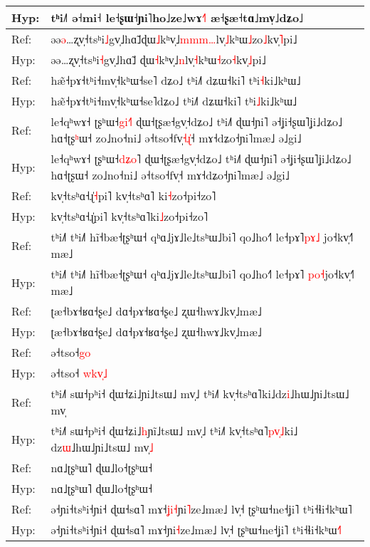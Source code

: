 \documentclass[10pt]{article}
\DeclareRobustCommand{\hl}[1]{{\textcolor{red}{#1}}}
\begin{document}
\begin{longtable}{ll}
Hyp: & tʰi˩˥ ə˧mi˧\hl{ }le˧ʂɯ˧ɲi˥ho˩ze˩wɤ\hl{˧}\hl{˥} æ˧ʂæ˧tɑ˩mv̩˩dʑo˩ \\ 
\midrule 
Ref: & əə\hl{ə}…ʐv̩˧tsʰi\hl{˩}gv̩˩hɑ̃˩ɖɯ\hl{˩}kʰv̩˩\hl{m}\hl{m}\hl{m}\hl{…}lv̩\hl{˩}kʰɯ\hl{˩}zo\hl{˩}kv̩\hl{˥}pi˩ \\ 
Hyp: & əə…ʐv̩˧tsʰi\hl{˧}gv̩˩hɑ̃˩\hl{ }ɖɯ\hl{˧}kʰv̩˩\hl{n}lv̩\hl{˧}kʰɯ\hl{˧}zo\hl{˧}kv̩\hl{˩}pi˩ \\ 
\midrule 
Ref: & hæ̃˧pɤ˧tʰi˧mv̩˧kʰɯ˧se˥\hl{ }dʑo˩ tʰi˩˥ dʑɯ˧ki˥ tʰi\hl{˧}ki˩kʰɯ˩ \\ 
Hyp: & hæ̃˧pɤ˧tʰi˧mv̩˧kʰɯ˧se˥dʑo˩ tʰi˩˥ dʑɯ˧ki˥ tʰi\hl{˩}ki˩kʰɯ˩ \\ 
\midrule 
Ref: & le˧qʰwɤ˧ ʈʂʰɯ˧\hl{g}\hl{i}\hl{˧}˥ ɖɯ˧ʈʂæ˧gv̩˧dʑo˩ tʰi˩˥ ɖɯ˧ɲi˥ ə˧ʝi˧ʂɯ˥ʝi˩dʑo˩ hɑ˧ʈʂ\hl{ʰ}ɯ˧ zo˩no˧ni˩ ə˧tso˧fv̩\hl{˧}\hl{ɻ}\hl{̍}˧ mɤ˧dʑo˧ɲi˥mæ˩ ə˩gi˩ \\ 
Hyp: & le˧qʰwɤ˧ ʈʂʰɯ˧\hl{d}\hl{ʑ}\hl{o}˥ ɖɯ˧ʈʂæ˧gv̩˧dʑo˩ tʰi˩˥ ɖɯ˧ɲi˥ ə˧ʝi˧ʂɯ˥ʝi˩dʑo˩ hɑ˧ʈʂɯ˧ zo˩no˧ni˩ ə˧tso˧fv̩˧ mɤ˧dʑo˧ɲi˥mæ˩ ə˩gi˩ \\ 
\midrule 
Ref: & kv̩˧tsʰɑ˧ɻ̍\hl{˧}pi˥ kv̩˧tsʰɑ˥\hl{ }ki\hl{˧}zo˧pi˧zo˥ \\ 
Hyp: & kv̩˧tsʰɑ˧ɻ̍pi˥ kv̩˧tsʰɑ˥ki\hl{˩}zo˧pi˧zo˥ \\ 
\midrule 
Ref: & tʰi˩˥ tʰi˩˥ hĩ˧bæ˧ʈʂʰɯ˧ qʰɑ˩jɤ˩le˩tsʰɯ˩bi˥ qo˩ho˧˥ le˧pɤ˥\hl{p}\hl{ɤ}\hl{˩}\hl{ }jo˧kv̩˧˥ mæ˩ \\ 
Hyp: & tʰi˩˥ tʰi˩˥ hĩ˧bæ˧ʈʂʰɯ˧ qʰɑ˩jɤ˩le˩tsʰɯ˩bi˥ qo˩ho˧˥ le˧pɤ˥\hl{ }\hl{p}\hl{o}\hl{˧}jo˧kv̩˧˥ mæ˩ \\ 
\midrule 
Ref: & ʈæ˧bɤ˧ʁɑ˧ʂe˩ dɑ˧pɤ˧ʁɑ˧ʂe˩ ʐɯ˧hwɤ˩kv̩˩mæ˩ \\ 
Hyp: & ʈæ˧bɤ˧ʁɑ˧ʂe˩ dɑ˧pɤ˧ʁɑ˧ʂe˩ ʐɯ˧hwɤ˩kv̩˩mæ˩ \\ 
\midrule 
Ref: & ə˧tso˧\hl{g}\hl{o} \\ 
Hyp: & ə˧tso˧\hl{ }\hl{w}\hl{k}\hl{v}\hl{̩}\hl{˩} \\ 
\midrule 
Ref: & tʰi˩˥ sɯ˧pʰi˧ ɖɯ˧ʑi˩ɲi˩tsɯ˩ mv̩˩ tʰi˩˥ kv̩˧tsʰɑ˥ki˩dz\hl{i}˩hɯ˩ɲi˩tsɯ˩ mv̩ \\ 
Hyp: & tʰi˩˥ sɯ˧pʰi˧ ɖɯ˧ʑi˩\hl{h}ɲi\hl{̃}˩tsɯ˩ mv̩˩ tʰi˩˥ kv̩˧tsʰɑ˥\hl{p}\hl{v}\hl{̩}\hl{˩}ki˩\hl{ }dz\hl{ɯ}˩hɯ˩ɲi˩tsɯ˩ mv̩\hl{˩} \\ 
\midrule 
Ref: & nɑ˩ʈʂʰɯ˥ ɖɯ˩lo˧ʈʂʰɯ˧ \\ 
Hyp: & nɑ˩ʈʂʰɯ˥ ɖɯ˩lo˧ʈʂʰɯ˧ \\ 
\midrule 
Ref: & ə˧ɲi˧tsʰi˧ɲi˧ ɖɯ˧sɑ˥ mɤ˧\hl{ʝ}\hl{i}\hl{˧}ɲi\hl{˥}ze˩mæ˩ lv̩˧ ʈʂʰɯ˧ne˧ʝi˥ tʰi˧ɬi˧kʰɯ˥ \\ 
Hyp: & ə˧ɲi˧tsʰi˧ɲi˧ ɖɯ˧sɑ˥ mɤ˧ɲi\hl{˧}ze˩mæ˩ lv̩˧ ʈʂʰɯ˧ne˧ʝi˥ tʰi˧ɬi˧kʰɯ\hl{˧}˥ \\ 

\end{longtable}
\end{document}
